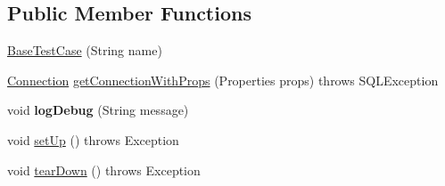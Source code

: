 \subsection*{Public Member Functions}
\begin{DoxyCompactItemize}
\item 
\mbox{\hyperlink{classtestsuite_1_1_base_test_case_a353e63229f72905eb043169b6c2002b5}{Base\+Test\+Case}} (String name)
\item 
\mbox{\hyperlink{interfacecom_1_1mysql_1_1jdbc_1_1_connection}{Connection}} \mbox{\hyperlink{classtestsuite_1_1_base_test_case_a694c26abcb73b73849f9d10ffdc4ebae}{get\+Connection\+With\+Props}} (Properties props)  throws S\+Q\+L\+Exception 
\item 
\mbox{\label{classtestsuite_1_1_base_test_case_ad4d75cf77ae765c312cda0d97c610a21}} 
void {\bfseries log\+Debug} (String message)
\item 
void \mbox{\hyperlink{classtestsuite_1_1_base_test_case_a195f5d285c7979328734606d08ad15b1}{set\+Up}} ()  throws Exception 
\item 
void \mbox{\hyperlink{classtestsuite_1_1_base_test_case_a51c7d76ab24b0c966f956250fd7a4f52}{tear\+Down}} ()  throws Exception 
\end{DoxyCompactItemize}
